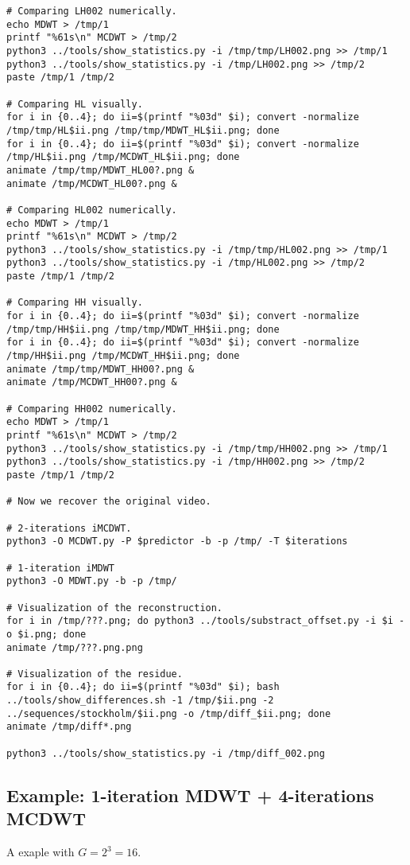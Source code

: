 \begin{verbatim}
# Comparing LH002 numerically.
echo MDWT > /tmp/1
printf "%61s\n" MCDWT > /tmp/2
python3 ../tools/show_statistics.py -i /tmp/tmp/LH002.png >> /tmp/1
python3 ../tools/show_statistics.py -i /tmp/LH002.png >> /tmp/2
paste /tmp/1 /tmp/2

# Comparing HL visually.
for i in {0..4}; do ii=$(printf "%03d" $i); convert -normalize /tmp/tmp/HL$ii.png /tmp/tmp/MDWT_HL$ii.png; done
for i in {0..4}; do ii=$(printf "%03d" $i); convert -normalize /tmp/HL$ii.png /tmp/MCDWT_HL$ii.png; done
animate /tmp/tmp/MDWT_HL00?.png &
animate /tmp/MCDWT_HL00?.png &

# Comparing HL002 numerically.
echo MDWT > /tmp/1
printf "%61s\n" MCDWT > /tmp/2
python3 ../tools/show_statistics.py -i /tmp/tmp/HL002.png >> /tmp/1
python3 ../tools/show_statistics.py -i /tmp/HL002.png >> /tmp/2
paste /tmp/1 /tmp/2

# Comparing HH visually.
for i in {0..4}; do ii=$(printf "%03d" $i); convert -normalize /tmp/tmp/HH$ii.png /tmp/tmp/MDWT_HH$ii.png; done
for i in {0..4}; do ii=$(printf "%03d" $i); convert -normalize /tmp/HH$ii.png /tmp/MCDWT_HH$ii.png; done
animate /tmp/tmp/MDWT_HH00?.png &
animate /tmp/MCDWT_HH00?.png &

# Comparing HH002 numerically.
echo MDWT > /tmp/1
printf "%61s\n" MCDWT > /tmp/2
python3 ../tools/show_statistics.py -i /tmp/tmp/HH002.png >> /tmp/1
python3 ../tools/show_statistics.py -i /tmp/HH002.png >> /tmp/2
paste /tmp/1 /tmp/2

# Now we recover the original video.

# 2-iterations iMCDWT.
python3 -O MCDWT.py -P $predictor -b -p /tmp/ -T $iterations

# 1-iteration iMDWT
python3 -O MDWT.py -b -p /tmp/

# Visualization of the reconstruction.
for i in /tmp/???.png; do python3 ../tools/substract_offset.py -i $i -o $i.png; done
animate /tmp/???.png.png

# Visualization of the residue.
for i in {0..4}; do ii=$(printf "%03d" $i); bash ../tools/show_differences.sh -1 /tmp/$ii.png -2 ../sequences/stockholm/$ii.png -o /tmp/diff_$ii.png; done
animate /tmp/diff*.png

python3 ../tools/show_statistics.py -i /tmp/diff_002.png
\end{verbatim}

\subsection*{Example: 1-iteration MDWT + 4-iterations MCDWT}
A exaple with $G=2^3=16$.

